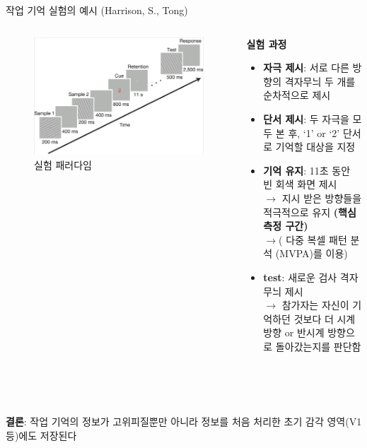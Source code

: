 \documentclass{beamer}
\begin{document}
\begin{frame}{작업 기억 실험의 예시 (Harrison, S., Tong)}
  \begin{columns}
    \begin{column}{0.38\textwidth}
      \centering
      \begin{figure}
        \centering
        \includegraphics[width=\textwidth]{image/Harrison}
        \caption{실험 패러다임}
      \end{figure}
    \end{column}
    \hfill
    \begin{column}{0.62\textwidth}
      \textbf{실험 과정}
      \vspace{-0.5em}
      \begin{itemize}
        \setlength{\itemsep}{0em}
        \setlength{\parskip}{0em}
        \item \textbf{자극 제시}: 서로 다른 방향의 격자무늬 두 개를 순차적으로 제시
        \item \textbf{단서 제시}: 두 자극을 모두 본 후, `1' or `2' 단서로 기억할 대상을 지정
        \item \textbf{기억 유지}: 11초 동안 빈 회색 화면 제시\\
          $\rightarrow$ 지시 받은 방향들을 적극적으로 유지 \textbf{(핵심 측정 구간)}\\
          $\rightarrow$( 다중 복셀 패턴 분석 (MVPA)를 이용)
        \item \textbf{test}: 새로운 검사 격자무늬 제시\\
          $\rightarrow$ 참가자는 자신이 기억하던 것보다 더 시계 방향 or 반시계 방향으로 돌아갔는지를 판단함
      \end{itemize}
    \end{column}
  \end{columns}\\~\\~\\

  \textbf{결론}: 작업 기억의 정보가 고위피질뿐만 아니라 정보를 처음 처리한 초기 감각 영역(V1 등)에도 저장된다
\end{frame}
\end{document}
